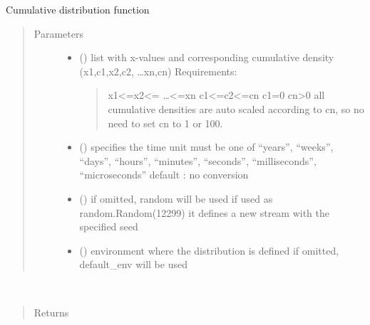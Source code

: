 \documentclass[letterpaper,10pt,english]{sphinxmanual}
\begin{document}
\begin{fulllineitems}
\label{\detokenize{Reference:salabim.Cdf}}
Cumulative distribution function
\begin{quote}\begin{description}
\item[{Parameters}] \leavevmode\begin{itemize}
\item {} 
 () \textendash{} 
list with x-values and corresponding cumulative density
(x1,c1,x2,c2, …xn,cn) 
Requirements:
\begin{quote}

x1\textless{}=x2\textless{}= …\textless{}=xn 
c1\textless{}=c2\textless{}=cn 
c1=0 
cn\textgreater{}0 
all cumulative densities are auto scaled according to cn,
so no need to set cn to 1 or 100.
\end{quote}


\item {} 
 () \textendash{} specifies the time unit 
must be one of “years”, “weeks”, “days”, “hours”, “minutes”, “seconds”, “milliseconds”, “microseconds” 
default : no conversion 

\item {} 
 () \textendash{} if omitted, random will be used 
if used as random.Random(12299)
it defines a new stream with the specified seed

\item {} 
 ({\hyperref[\detokenize{Reference:salabim.Environment}]{}}) \textendash{} environment where the distribution is defined 
if omitted, default\_env will be used

\end{itemize}

\end{description}\end{quote}

\begin{fulllineitems}
\label{\detokenize{Reference:salabim.Cdf.mean}}~\begin{quote}\begin{description}
\item[{Returns}] \leavevmode
{}


\end{description}
\end{quote}
\end{fulllineitems}
\end{fulllineitems}
\end{document}
